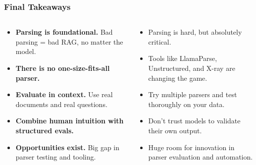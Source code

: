 \begin{frame}[fragile]\frametitle{Final Takeaways}
\begin{columns}
    \begin{column}[T]{0.5\linewidth}
  \begin{itemize}
    \item \textbf{Parsing is foundational.} Bad parsing = bad RAG, no matter the model.
    \item \textbf{There is no one-size-fits-all parser.}
    \item \textbf{Evaluate in context.} Use real documents and real questions.
    \item \textbf{Combine human intuition with structured evals.}
    \item \textbf{Opportunities exist.} Big gap in parser testing and tooling.
  \end{itemize}
    \end{column}
    \begin{column}[T]{0.5\linewidth}  
	
  \begin{itemize}
    \item Parsing is hard, but absolutely critical.
    \item Tools like LlamaParse, Unstructured, and X-ray are changing the game.
    \item Try multiple parsers and test thoroughly on your data.
    \item Don’t trust models to validate their own output.
    \item Huge room for innovation in parser evaluation and automation.
  \end{itemize}
    \end{column}
  \end{columns}   
  
\end{frame}

